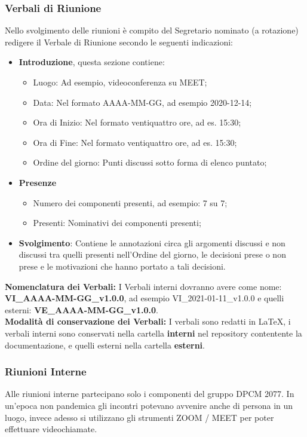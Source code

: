 \subsubsection{Verbali di Riunione}
Nello svolgimento delle riunioni è compito del Segretario nominato (a rotazione) redigere il Verbale di Riunione secondo le seguenti indicazioni:
\begin{itemize}
\item{\textbf{Introduzione}, questa sezione contiene:}
	\begin{itemize}
	\item{Luogo: Ad esempio, videoconferenza su MEET;}
	\item{Data: Nel formato AAAA-MM-GG, ad esempio 2020-12-14;}
	\item{Ora di Inizio:  Nel formato ventiquattro ore, ad es. 15:30;}
	\item{Ora di Fine:  Nel formato ventiquattro ore, ad es. 15:30;}
	\item{Ordine del giorno: Punti discussi sotto forma di elenco puntato;}
	\end{itemize}
\item{\textbf{Presenze}}
	\begin{itemize}
	\item{Numero dei componenti presenti, ad esempio: 7 su 7;}
	\item{Presenti: Nominativi dei componenti presenti;}
	\end{itemize}
\item{\textbf{Svolgimento}: Contiene le annotazioni circa gli argomenti discussi e non discussi tra quelli presenti nell’Ordine del giorno, le decisioni prese o non prese e le motivazioni che hanno portato a tali decisioni.}
\end{itemize}
\textbf{Nomenclatura dei Verbali: } I Verbali interni dovranno avere come nome: \textbf{VI\_AAAA-MM-GG\_v1.0.0}, ad esempio VI\_2021-01-11\_v1.0.0 e quelli esterni: \textbf{VE\_AAAA-MM-GG\_v1.0.0}. \\
\textbf{Modalità di conservazione dei Verbali:} I verbali sono redatti in \LaTeX, i verbali interni sono conservati nella cartella \textbf{interni} nel repository  contentente la documentazione, e quelli esterni nella cartella \textbf{esterni}.

\subsubsection{Riunioni Interne}
Alle riunioni interne partecipano solo i componenti del gruppo DPCM 2077.
In un'epoca non pandemica gli incontri potevano avvenire anche di persona in un luogo, invece adesso si utilizzano gli strumenti ZOOM / MEET per poter effettuare videochiamate.

